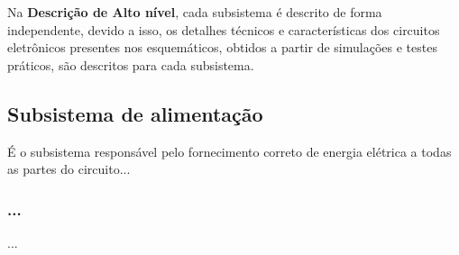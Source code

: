 Na \textbf{Descrição de Alto nível}, cada subsistema é descrito de forma independente, devido a isso, os detalhes técnicos e características dos circuitos eletrônicos presentes nos esquemáticos, obtidos a partir de simulações e testes práticos, são descritos para cada subsistema.

\subsection{Subsistema de alimentação}
É o subsistema responsável pelo fornecimento correto de energia elétrica a todas as partes do circuito...

\subsubsection{...}

...